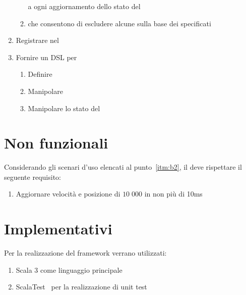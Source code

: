 \begin{enumerate}[label=\textbf{\ref{sec:funzionali}.\arabic*}]
\begin{enumerate}[label=\textbf{\ref{itm:f7}.\arabic*}]
        a ogni aggiornamento dello stato del \World
        \item \label{itm:ff11} \System che consentono di escludere alcune \Entity sulla base dei \Component specificati
    \end{enumerate}
    \item \label{itm:f8} Registrare \System nel \World
    \item \label{itm:f9} Fornire un DSL per
    \begin{enumerate}[label=\textbf{\ref{itm:f9}.\arabic*}]
        \item \label{itm:ff12} Definire \System
        \item \label{itm:ff13} Manipolare \Entity
        \item \label{itm:ff14} Manipolare lo stato del \World
    \end{enumerate}
\end{enumerate}


\section{Non funzionali}\label{sec:non-funzionali}
Considerando gli scenari d'uso elencati al punto~\ref{itm:b2}, il \System deve rispettare il seguente requisito:
\begin{enumerate}[label=\textbf{\ref{sec:non-funzionali}.\arabic*}]
    \item \label{itm:nf1} Aggiornare velocità e posizione di $10\;000$ \Entity in non più di 10ms
\end{enumerate}


\section{Implementativi}\label{sec:implementativi}
Per la realizzazione del framework verrano utilizzati:
\begin{enumerate}[label=\textbf{\ref{sec:implementativi}.\arabic*}]
    \item \label{itm:i1} Scala 3 come linguaggio principale
    \item \label{itm:i2} ScalaTest~\cite{scalatest} per la realizzazione di unit test
\end{enumerate}
